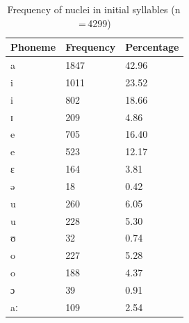 \begin{table}[pth]\centering
\caption[Frequency of nuclei in initial syllables]{Frequency of nuclei in 
initial syllables (n\,=\,4299)}
\begin{tabu} to 0.5\linewidth{X X[c] X[c]}
\tableheaderfont\toprule
Phoneme
	& Frequency
	& Percentage
	\\
	
\toprule

a
	& 1847
	& 42.96\pct
	\\

\midrule

i
	& 1011
	& 23.52\pct
	\\

\rowfont{\scriptsize\itshape}
\raggedleft
i
	& 802
	& 18.66\pct
	\\

\rowfont{\scriptsize\itshape}
\raggedleft
ɪ
	& 209
	& 4.86\pct
	\\

\midrule

e
	& 705
	& 16.40\pct
	\\

\rowfont{\scriptsize\itshape}
\raggedleft
e
	& 523
	& 12.17\pct
	\\

\rowfont{\scriptsize\itshape}
\raggedleft
ɛ
	& 164
	& 3.81\pct
	\\

\rowfont{\scriptsize\itshape}
\raggedleft
ə
	& 18
	& 0.42\pct
	\\

\midrule

u
	& 260
	& 6.05\pct
	\\

\rowfont{\scriptsize\itshape}
\raggedleft
u
	& 228
	& 5.30\pct
	\\

\rowfont{\scriptsize\itshape}
\raggedleft
ʊ
	& 32
	& 0.74\pct
	\\

\midrule

o
	& 227
	& 5.28\pct
	\\

\rowfont{\scriptsize\itshape}
\raggedleft
o
	& 188
	& 4.37\pct
	\\

\rowfont{\scriptsize\itshape}
\raggedleft
ɔ
	& 39
	& 0.91\pct
	\\

\midrule

aː
	& 109
	& 2.54\pct
	\\


\end{tabu}
\end{table}
